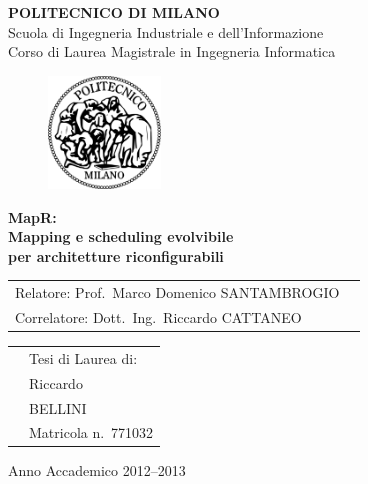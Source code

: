 \documentclass[a4paper]{report}
\begin{document}
\begin{titlepage}

\begin{center}
\LARGE
\textbf{POLITECNICO DI MILANO} \\
\Large
Scuola di Ingegneria Industriale e dell'Informazione \\
Corso di Laurea Magistrale in Ingegneria Informatica
\end{center}

\addvspace{1.5cm}
\begin{figure}[h]
\begin{center}
\includegraphics[width=3cm]{figure/PoliMi}
\end{center}
\end{figure}

\addvspace{0.75cm}
\begin{center}
\LARGE
\textbf{MapR:\\Mapping e scheduling evolvibile\\per architetture riconfigurabili}
\end{center}

\addvspace{4cm}
\Large
\begin{center}
\begin{tabular}{p{}p{}}
Relatore: Prof.~Marco Domenico SANTAMBROGIO& \\
Correlatore: Dott.~Ing.~Riccardo CATTANEO& \\ %
\end{tabular}
\end{center}

\addvspace{2cm}
\Large
\begin{center}
\begin{tabular}{p{}p{}}
& Tesi di Laurea di: \\
& Riccardo \\ 
& BELLINI \\
& Matricola n.~771032
\end{tabular}
\end{center}

\vfill
\Large
\begin{center}
Anno Accademico 2012--2013
\end{center}
\end{titlepage}
\end{document}
